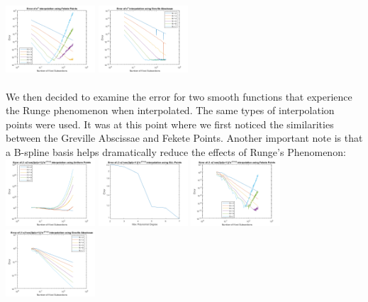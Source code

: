 \documentclass{article}
\begin{document}
\includegraphics[height = 2.5cm]{ExpFekete.png} \includegraphics[height = 2.5cm]{ExpGreville.png}

\paragraph{}
We then decided to examine the error for two smooth functions that experience the Runge phenomenon when interpolated. The same types of interpolation points were used. It was at this point where we first noticed the similarities between the Greville Abscissae and Fekete Points. Another important note is that a B-spline basis helps dramatically reduce the effects of Runge's Phenomenon:
\newline
\includegraphics[height = 2.5cm]{CosExpUniform.png} \includegraphics[height = 2.5cm]{CosExpGLL.png}
\includegraphics[height = 2.5cm]{CosExpFekete.png} \includegraphics[height = 2.5cm]{CosExpGreville.png}
\end{document}
